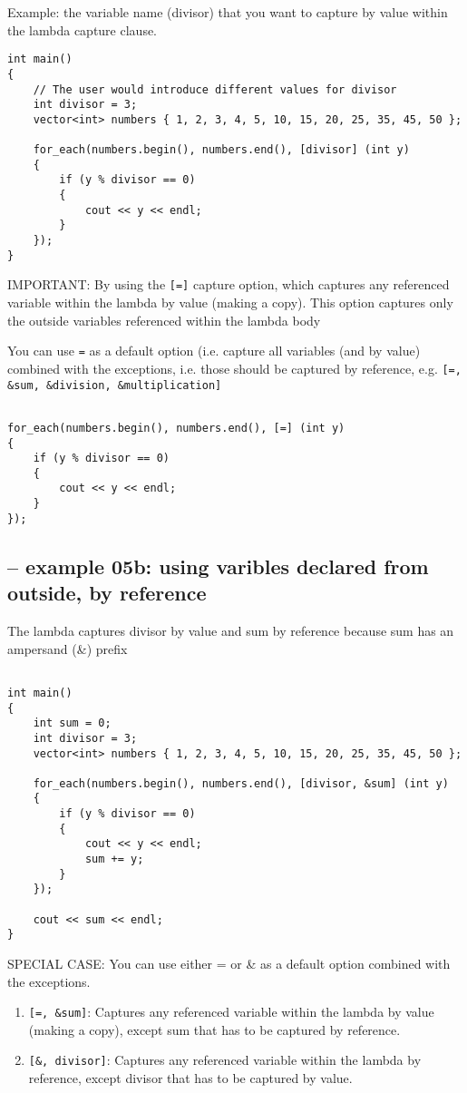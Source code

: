 Example: the variable name (divisor) that you want to capture by value within
the lambda capture clause.

\begin{lstlisting}
int main()
{
    // The user would introduce different values for divisor    
    int divisor = 3;
    vector<int> numbers { 1, 2, 3, 4, 5, 10, 15, 20, 25, 35, 45, 50 };
    
    for_each(numbers.begin(), numbers.end(), [divisor] (int y)
    {
        if (y % divisor == 0)
        {
            cout << y << endl;
        }
    });
}
\end{lstlisting}


IMPORTANT: By using the \verb![=]! capture option, which captures any referenced
variable within the lambda by value (making a copy). This option captures only
the outside variables referenced within the lambda body

You can use  \verb!=! as a default option (i.e. capture all variables (and by
value) combined with the exceptions, i.e. those should be captured by reference,
e.g. \verb![=, &sum, &division, &multiplication]!

\begin{lstlisting}

for_each(numbers.begin(), numbers.end(), [=] (int y)
{
    if (y % divisor == 0)
    {
        cout << y << endl;
    }
});
\end{lstlisting}

\subsection{-- example 05b: using varibles declared from outside, by reference}

The lambda captures divisor by value and sum by reference because sum has an
ampersand (\&) prefix

\begin{lstlisting}

int main()
{
    int sum = 0;
    int divisor = 3;
    vector<int> numbers { 1, 2, 3, 4, 5, 10, 15, 20, 25, 35, 45, 50 };
    
    for_each(numbers.begin(), numbers.end(), [divisor, &sum] (int y)
    {
        if (y % divisor == 0)
        {
            cout << y << endl;
            sum += y;
        }
    });
 
    cout << sum << endl;
}
\end{lstlisting}

SPECIAL CASE: You can use either = or \& as a default option combined with the exceptions.
\begin{enumerate}
  
  \item \verb![=, &sum]!: Captures any referenced variable within the lambda by value (making a copy), except sum that has to be captured by reference.
  
  
  \item \verb![&, divisor]!: Captures any referenced variable within the lambda by reference, except divisor that has to be captured by value.
\end{enumerate}


